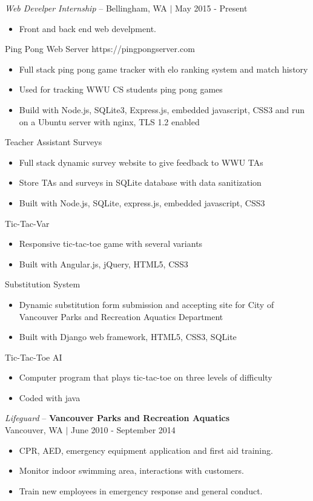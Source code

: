 \documentclass[line,margin]{res}
\begin{document}
\begin{resume}
	{\sl Web Develper Internship} -- {\footnotesize Bellingham, WA $|$  May 2015 - Present}
	\begin{itemize} \itemsep -2pt
		\item Front and back end web develpment.
	\end{itemize}
	Ping Pong Web Server {\footnotesize https://pingpongserver.com}
\begin{itemize}\itemsep -2pt
		\item Full stack ping pong game tracker with elo ranking system and match history
		\item Used for tracking WWU CS students ping pong games
		\item Build with Node.js, SQLite3, Express.js, embedded javascript, CSS3 and run on a Ubuntu server with nginx, TLS 1.2 enabled
	\end{itemize}
	Teacher Assistant Surveys
	\begin{itemize} \itemsep -2pt
		\item Full stack dynamic survey website to give feedback to WWU TAs
		\item Store TAs and surveys in SQLite database with data sanitization
		\item Built with Node.js, SQLite, express.js, embedded javascript, CSS3
	\end{itemize}
	Tic-Tac-Var
	\begin{itemize} \itemsep -2pt
		\item Responsive tic-tac-toe game with several variants
		\item Built with Angular.js, jQuery, HTML5, CSS3
	\end{itemize}
	Substitution System
	\begin{itemize} \itemsep -2pt
		\item Dynamic substitution form submission and accepting site for City of Vancouver Parks and Recreation Aquatics Department
		\item Built with Django web framework, HTML5, CSS3, SQLite
	\end{itemize}
	Tic-Tac-Toe AI
	\begin{itemize} \itemsep -2pt
		\item Computer program that plays tic-tac-toe on three levels of difficulty
		\item Coded with java
	\end{itemize}

	{\sl Lifeguard} -- {\bf Vancouver Parks and Recreation Aquatics} \\
	{\footnotesize Vancouver, WA $|$  June 2010 - September 2014}
	\begin{itemize} \itemsep -2pt
		\item CPR, AED, emergency equipment application and first aid training.
		\item Monitor indoor swimming area, interactions with customers.
		\item Train new employees in emergency response and general conduct.
	\end{itemize}


\end{resume}
\end{document}

